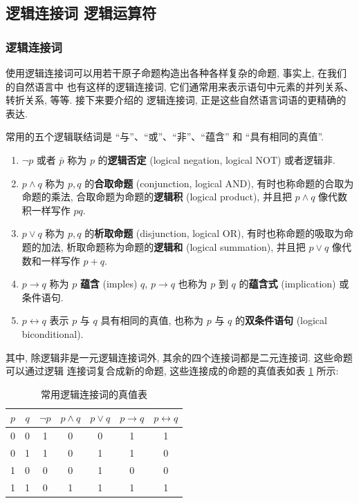 \documentclass[10pt,UTF8]{book} %
\begin{document}
\subsection{逻辑连接词 \quad 逻辑运算符}

\subsubsection{逻辑连接词}

使用逻辑连接词可以用若干原子命题构造出各种各样复杂的命题, 事实上, 在我们的自然语言中
也有这样的逻辑连接词, 它们通常用来表示语句中元素的并列关系、转折关系, 等等. 接下来要介绍的
逻辑连接词, 正是这些自然语言词语的更精确的表达.

\begin{definition}[命题连接词]
    常用的五个逻辑联结词是 “与”、“或”、“非”、“蕴含” 和 “具有相同的真值”.
    \begin{enumerate}[label={$\left.\arabic*\right)$}, itemsep=0pt]
        \item $\lnot p$ 或者 $\bar p$ 称为 $p$ 的\textbf{逻辑否定} (logical negation, logical NOT) 或者逻辑非.
        \item $p \wedge q$ 称为 $p,q$ 的\textbf{合取命题} (conjunction, logical AND),
        有时也称命题的合取为命题的乘法, 合取命题为命题的\textbf{逻辑积} (logical product), 
        并且把 $p \wedge q$ 像代数积一样写作 $pq$.
        \item $p \vee q$ 称为 $p,q$ 的\textbf{析取命题} (disjunction, logical OR),
        有时也称命题的吸取为命题的加法, 析取命题称为命题的\textbf{逻辑和} (logical summation),
        并且把 $p \vee q$ 像代数和一样写作 $p+q$. 
        \item $p \rightarrow q$ 称为 $p$ \textbf{蕴含} (imples) $q$,
            $p \to q$ 也称为 $p$ 到 $q$ 的\textbf{蕴含式} (implication) 或条件语句.
        \item $p \leftrightarrow q$ 表示 {\kaishu $p$ 与 $q$ 具有相同的真值}, 也称为 $p$ 与 $q$ 的\textbf{双条件语句} (logical biconditional).
    \end{enumerate}
    其中, 除逻辑非是一元逻辑连接词外, 其余的四个连接词都是二元连接词. 这些命题可以通过逻辑
    连接词复合成新的命题, 这些连接成的命题的真值表如表 \ref{常用逻辑连接词的真值表} 所示:
    \begin{table}[H]
        \centering
        \caption{常用逻辑连接词的真值表}
        \label{常用逻辑连接词的真值表}
        \begin{tabular}{cc|ccccc}
            \toprule
            $p$ & $q$ & $\lnot p$ & $p \wedge q$ 
            & $p \vee q$ & $p \to q$ & $p \leftrightarrow q$ \\
            \midrule
            0 & 0 & 1 & 0 & 0 & 1 & 1\\ 
            0 & 1 & 1 & 0 & 1 & 1 & 0\\ 
            1 & 0 & 0 & 0 & 1 & 0 & 0\\ 
            1 & 1 & 0 & 1 & 1 & 1 & 1\\ 
            \bottomrule
        \end{tabular}
    \end{table}
\end{definition}
\end{document}
